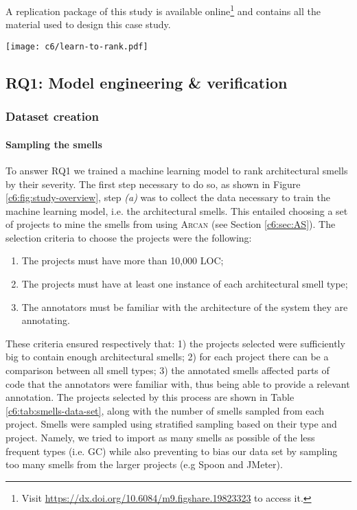 A replication package of this study is available online\footnote{Visit \url{https://dx.doi.org/10.6084/m9.figshare.19823323} to access it.} and contains all the material used to design this case study.

\begin{figure*}
    \centering
    \texttt{[image: c6/learn-to-rank.pdf]}
    \caption{Detailed diagram of the model engineering and model evaluation phases.}\label{c6:fig:study-overview}
\end{figure*}

\subsection{RQ1: Model engineering \& verification}\label{c6:sec:rq1-methodology}
\subsubsection{Dataset creation}
\paragraph{Sampling the smells}
To answer RQ1 we trained a machine learning model to rank architectural smells by their severity.
The first step necessary to do so, as shown in Figure \ref{c6:fig:study-overview}, step \emph{(a)} was to collect the data necessary to train the machine learning model, i.e. the architectural smells. This entailed choosing a set of projects to mine the smells from using \textsc{Arcan} (see Section \ref{c6:sec:AS}). 
The selection criteria to choose the projects were the following:
\begin{enumerate}
    \item The projects must have more than 10,000 LOC; 
    \item The projects must have at least one instance of each architectural smell type;
    \item The annotators must be familiar with the architecture of the system they are annotating.
\end{enumerate}
These criteria ensured respectively that: 1) the projects selected were sufficiently big to contain enough architectural smells; 2) for each project there can be a comparison between all smell types; 3) the annotated smells affected parts of code that the annotators were familiar with, thus being able to provide a relevant annotation.
The projects selected by this process are shown in Table \ref{c6:tab:smells-data-set}, along with the number of smells sampled from each project.
Smells were sampled using stratified sampling based on their type and project.
Namely, we tried to import as many smells as possible of the less frequent types (i.e. GC) while also preventing to bias our data set by sampling too many smells from the larger projects (e.g Spoon and JMeter).

